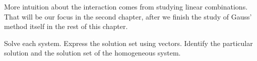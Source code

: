 More intuition about the interaction comes from studying linear
combinations.
That will be our focus in the second chapter, after we finish the study
of Gauss' method itself in the rest of this chapter.

\begin{exercises}
  \recommended \item 
    Solve each system.
    Express the solution set using vectors.
    Identify the particular solution and the solution set of the
    homogeneous system.
\end{exercises}
